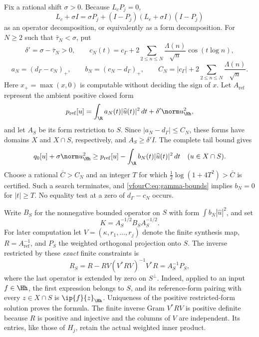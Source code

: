 Fix a rational shift $\sigma>0$.  Because $L_cP_j=0$,
\begin{equation}\label{vfourC:eq:null-decomposition}
 L_c+\sigma I
   =\sigma P_j+(I-P_j)(L_c+\sigma I)(I-P_j)
\end{equation}
as an operator decomposition, or equivalently as a form decomposition.  For
$N\ge2$ such that $\bar\tau_N<\sigma$, put
\[
 \delta'=\sigma-\bar\tau_N>0,\qquad
 c_N(t)=c_\Gamma+2\sum_{2\le n\le N}\frac{\Lambda(n)}{\sqrt n}
                                  \cos(t\log n),
\]
\[
 a_N=(d_\Gamma-c_N)_+,\qquad b_N=(c_N-d_\Gamma)_+,\qquad
 C_N=|c_\Gamma|+2\sum_{2\le n\le N}\frac{\Lambda(n)}{\sqrt n}.
\]
Here $x_+=\max(x,0)$ is computable without deciding the sign of $x$.
Let $A_{\mathrm{ref}}$ represent the ambient positive closed form
\begin{equation}\label{vfourC:eq:reference-form}
 p_{\mathrm{ref}}[u]=\int_{\R}a_N(t)|\widehat u(t)|^2\,dt
                         +\delta'\norm u_{\Hh}^2,
\end{equation}
and let $A_S$ be its form restriction to $S$.  Since
$|a_N-d_\Gamma|\le C_N$, these forms have domains $X$ and $X\cap S$,
respectively, and $A_S\ge\delta'I$.  The complete tail bound gives
\begin{equation}\label{vfourC:eq:head-comparison}
 q_0[u]+\sigma\norm u_{\Hh}^2
 \ge p_{\mathrm{ref}}[u]-\int_{\R}b_N(t)|\widehat u(t)|^2\,dt
 \quad(u\in X\cap S).
\end{equation}
Choose a rational $\bar C>C_N$ and an integer $T$ for which
$\tfrac12\log(1+4T^2)>\bar C$ is certified.  Such a search terminates, and
\eqref{vfourC:eq:gamma-bounds} implies $b_N=0$ for $|t|\ge T$.
No equality test at a zero of $d_\Gamma-c_N$ occurs.

Write $B_S$ for the nonnegative bounded operator on $S$ with form
$\int b_N|\widehat u|^2$, and set
\begin{equation}\label{vfourC:eq:BS}
 K=A_S^{-1/2}B_SA_S^{-1/2}.
\end{equation}
For later computation let $V=(\kappa,r_1,\ldots,r_j)$ denote the finite synthesis
map, $R=A_{\mathrm{ref}}^{-1}$, and $P_S$ the weighted orthogonal projection onto
$S$.  The inverse restricted by these \emph{exact} finite constraints is
\begin{equation}\label{vfourC:eq:restricted-inverse}
 R_S=R-RV(V^*RV)^{-1}V^*R=A_S^{-1}P_S,
\end{equation}
where the last operator is extended by zero on $S^\perp$.
Indeed, applied to an input $f\in\Hh$, the first expression belongs to $S$,
and its reference-form pairing with every $z\in X\cap S$ is
$\ip{f}{z}_{\Hh}$.
Uniqueness of the positive restricted-form solution proves the formula.
The finite inverse Gram $V^*RV$ is positive definite because $R$ is positive
and injective and the columns of $V$ are independent.  Its entries, like those
of $H_j$, retain the actual weighted inner product.

